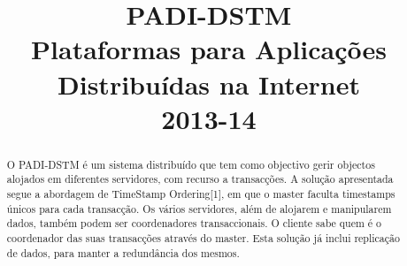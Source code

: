\documentclass[times, 10pt,twocolumn]{article}
\begin{document}
\title{\huge{PADI-DSTM} \\[0,1in] \textmd{Plataformas para Aplicações Distribuídas na Internet \\[0,05in] 2013-14}}

\maketitle
\thispagestyle{empty}

\begin{abstract}
O PADI-DSTM é um sistema distribuído que tem como objectivo gerir objectos alojados em diferentes servidores, com recurso a transacções. A solução apresentada segue a abordagem de TimeStamp Ordering[1], em que o master faculta timestamps únicos para cada transacção. Os vários servidores, além de alojarem e manipularem dados, também podem ser coordenadores transaccionais. O cliente sabe quem é o coordenador das suas transacções através do master. Esta solução já inclui replicação de dados, para manter a redundância dos mesmos.
\end{abstract}







\nocite{ex1}


\end{document}
